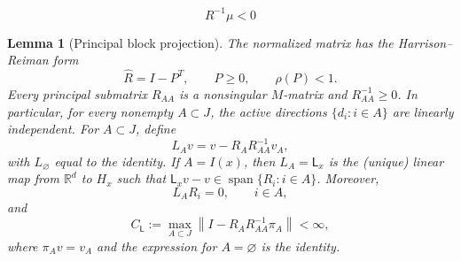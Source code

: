 \documentclass[10pt,a4paper]{amsart}
\newtheorem{lemma}{Lemma}
\begin{document}
\begin{equation}\label{eq:stability}
 R^{-1}\mu<0
\end{equation}

\begin{lemma}[Principal block projection]\label{lem:Mmatrix}\label{lem:projection}
The normalized matrix has the Harrison--Reiman form
\begin{equation}\label{eq:HR-form}
 \widehat R=I-P^T,
 \qquad P\ge0,
 \qquad \rho(P)<1.
\end{equation}
Every principal submatrix $R_{AA}$ is a nonsingular $M$-matrix and $R_{AA}^{-1}\ge0$. In particular, for every nonempty $A\subset J$, the active directions $\{d_i:i\in A\}$ are linearly independent. For $A\subset J$, define
\begin{equation}\label{eq:projection-formula}
 L_Av=v-R_A R_{AA}^{-1}v_A,
\end{equation}
with $L_\varnothing$ equal to the identity. If $A=I(x)$, then $L_A=\mathsf L_x$ is the (unique) linear map from $\mathbb R^d$ to $H_x$ such that $\mathsf L_xv-v\in\operatorname{span}\{R_i:i\in A\}$. Moreover,
\begin{equation}\label{eq:projection-kills}
 L_A R_i=0,
 \qquad i\in A,
\end{equation}
and
\begin{equation}\label{eq:projection-uniform-constant}
 C_{\mathsf L}:=\max_{A\subset J}\left\|I-R_A R_{AA}^{-1}\pi_A\right\|<\infty,
\end{equation}
where $\pi_Av=v_A$ and the expression for $A=\varnothing$ is the identity.
\end{lemma}
\end{document}
